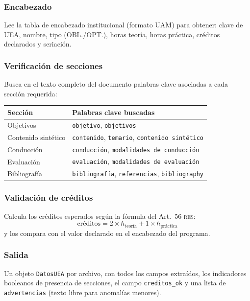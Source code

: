 \documentclass[11pt,a4paper]{article}
\newcommand{\RES}{\textsc{res}}
\begin{document}
\subsubsection{Encabezado}

Lee la tabla de encabezado institucional (formato UAM) para obtener: clave de UEA,
nombre, tipo (OBL./OPT.), horas teoría, horas práctica, créditos declarados
y seriación.

\subsubsection{Verificación de secciones}

Busca en el texto completo del documento palabras clave asociadas a cada sección
requerida:

\begin{center}
\begin{tabular}{ll}
\toprule
\textbf{Sección} & \textbf{Palabras clave buscadas} \\
\midrule
Objetivos             & \texttt{objetivo}, \texttt{objetivos} \\
Contenido sintético   & \texttt{contenido}, \texttt{temario}, \texttt{contenido sintético} \\
Conducción            & \texttt{conducción}, \texttt{modalidades de conducción} \\
Evaluación            & \texttt{evaluación}, \texttt{modalidades de evaluación} \\
Bibliografía          & \texttt{bibliografía}, \texttt{referencias}, \texttt{bibliography} \\
\bottomrule
\end{tabular}
\end{center}

\subsubsection{Validación de créditos}

Calcula los créditos esperados según la fórmula del Art.\ 56 \RES{}:
\[
  \text{créditos} = 2 \times h_{\text{teoría}} + 1 \times h_{\text{práctica}}
\]
y los compara con el valor declarado en el encabezado del programa.

\subsubsection{Salida}

Un objeto \texttt{DatosUEA} por archivo, con todos los campos extraídos, los
indicadores booleanos de presencia de secciones, el campo \texttt{creditos\_ok}
y una lista de \texttt{advertencias} (texto libre para anomalías menores).
\end{document}
